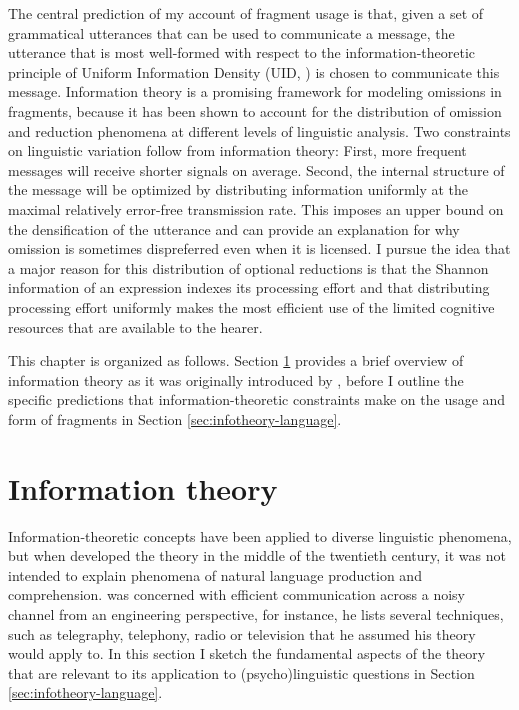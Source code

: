 The central prediction of my account of fragment usage is that, given a set of grammatical utterances that can be used to communicate a message, the utterance that is most well-formed with respect to the information-theoretic principle of Uniform Information Density (UID, ) is chosen to communicate this message. Information theory is a promising framework for modeling omissions in fragments, because it has been shown to account for the distribution of omission and reduction phenomena at different levels of linguistic analysis. Two constraints on linguistic variation follow from information theory: First, more frequent messages will receive shorter signals on average. Second, the internal structure of the message will be optimized by distributing information uniformly at the maximal relatively error-free transmission rate. This imposes an upper bound on the densification of the utterance and can provide an explanation for why omission is sometimes dispreferred even when it is licensed. I pursue the idea that a major reason for this distribution of optional reductions is that the Shannon information of an expression indexes its processing effort \citep{hale2001} and that distributing processing effort uniformly makes the most efficient use of the limited cognitive resources that are available to the hearer.

This chapter is organized as follows. Section \ref{sec:infotheory-noisy-channel} provides a brief overview of information theory as it was originally introduced by \citet{shannon1948}, before I outline the specific predictions that information-theoretic constraints make on the usage and form of fragments  in Section \ref{sec:infotheory-language}.

\section{Information theory}
\label{sec:infotheory-noisy-channel}
Information-theoretic concepts have been applied to diverse linguistic phenomena, but when \citet{shannon1948} developed the theory in the middle of the twentieth century, it was not intended to explain phenomena of natural language production and comprehension. \citeauthor{shannon1948} was concerned with efficient communication across a noisy channel from an engineering perspective, for instance, he lists several techniques, such as telegraphy, telephony, radio or television that he assumed his theory would apply to. In this section I sketch the fundamental aspects of the theory that are relevant to its application to (psycho)linguistic questions in Section \ref{sec:infotheory-language}.

